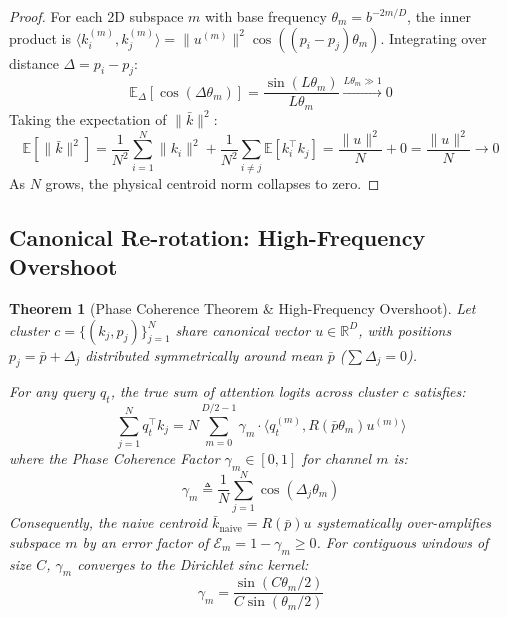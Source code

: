 \documentclass[11pt,a4paper]{article}
\newtheorem{theorem}{Theorem}
\begin{document}
\begin{proof}
For each 2D subspace $m$ with base frequency $\theta_m = b^{-2m/D}$, the inner product is $\langle k_i^{(m)}, k_j^{(m)} \rangle = \|u^{(m)}\|^2 \cos((p_i - p_j) \theta_m)$.
Integrating over distance $\Delta = p_i - p_j$:
\begin{equation}
\mathbb{E}_\Delta [\cos(\Delta \theta_m)] = \frac{\sin(L \theta_m)}{L \theta_m} \xrightarrow{L \theta_m \gg 1} 0
\end{equation}
Taking the expectation of $\|\bar{k}\|^2$:
\begin{equation}
\mathbb{E}[\|\bar{k}\|^2] = \frac{1}{N^2} \sum_{i=1}^N \|k_i\|^2 + \frac{1}{N^2} \sum_{i \ne j} \mathbb{E}[k_i^\top k_j] = \frac{\|u\|^2}{N} + 0 = \frac{\|u\|^2}{N} \to 0
\end{equation}
As $N$ grows, the physical centroid norm collapses to zero.
\end{proof}

\subsection{Canonical Re-rotation: High-Frequency Overshoot}
\begin{theorem}[Phase Coherence Theorem \& High-Frequency Overshoot]
Let cluster $c = \{ (k_j, p_j) \}_{j=1}^N$ share canonical vector $u \in \mathbb{R}^D$, with positions $p_j = \bar{p} + \Delta_j$ distributed symmetrically around mean $\bar{p}$ ($\sum \Delta_j = 0$).

For any query $q_t$, the true sum of attention logits across cluster $c$ satisfies:
\begin{equation}
\sum_{j=1}^N q_t^\top k_j = N \sum_{m=0}^{D/2-1} \gamma_m \cdot \langle q_t^{(m)}, R(\bar{p}\theta_m) u^{(m)} \rangle
\end{equation}
where the Phase Coherence Factor $\gamma_m \in [0, 1]$ for channel $m$ is:
\begin{equation}
\gamma_m \triangleq \frac{1}{N} \sum_{j=1}^N \cos(\Delta_j \theta_m)
\end{equation}
Consequently, the naive centroid $\bar{k}_{\text{naive}} = R(\bar{p}) u$ systematically over-amplifies subspace $m$ by an error factor of $\mathcal{E}_m = 1 - \gamma_m \ge 0$. For contiguous windows of size $C$, $\gamma_m$ converges to the Dirichlet sinc kernel:
\begin{equation}
\gamma_m = \frac{\sin(C \theta_m / 2)}{C \sin(\theta_m / 2)}
\end{equation}
\end{theorem}
\end{document}
